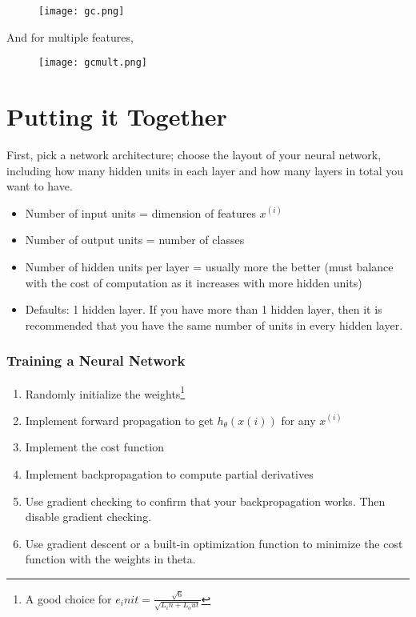     \begin{figure}[h]
      \texttt{[image: gc.png]}
    \end{figure}

    And for multiple features,

    \begin{figure}[h]
      \texttt{[image: gcmult.png]}
    \end{figure}

  \section{Putting it Together}
    First, pick a network architecture; choose the layout of your neural network, including how many hidden units in each layer and how many layers in total you want to have.

    \begin{itemize}
      \item Number of input units = dimension of features $x^{(i)}$
      \item Number of output units = number of classes
      \item Number of hidden units per layer = usually more the better (must balance with the cost of computation as it increases with more hidden units)
      \item Defaults: 1 hidden layer. If you have more than 1 hidden layer, then it is recommended that you have the same number of units in every hidden layer.
    \end{itemize}

    \subsubsection{Training a Neural Network}
      \begin{enumerate}
        \item Randomly initialize the weights\footnote[3]{A good choice for $e_init = \frac{\sqrt{6}}{\sqrt{L_in + L_out}}$}
        \item Implement forward propagation to get $h_\theta(x(i))$ for any $x^{(i)}$
        \item Implement the cost function
        \item Implement backpropagation to compute partial derivatives
        \item Use gradient checking to confirm that your backpropagation works. Then disable gradient checking.
        \item Use gradient descent or a built-in optimization function to minimize the cost function with the weights in theta.
      \end{enumerate}

